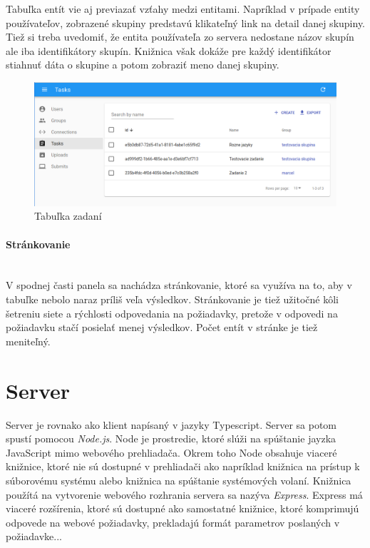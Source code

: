 Tabuľka entít vie aj previazať vzťahy medzi entitami. Napríklad v prípade entity používateľov, 
zobrazené skupiny predstavú klikateľný link na detail danej skupiny. Tiež si treba uvedomiť, že
entita používateľa zo servera nedostane názov skupín ale iba identifikátory skupín. Knižnica 
však dokáže pre každý identifikátor stiahnuť dáta o skupine a potom zobraziť meno danej skupiny.
\begin{figure}[H]
\centerline{\includegraphics[width=1\textwidth]{images/zadania}}
\caption[Tabuľka zadaní]{Tabuľka zadaní}
\label{obr:zadania}
\end{figure}

\paragraph{Stránkovanie}\leavevmode\\
V spodnej časti panela sa nachádza stránkovanie, ktoré sa využíva na to, aby v tabuľke nebolo naraz
príliš veľa výsledkov. Stránkovanie je tiež užitočné kôli šetreniu siete a rýchlosti odpovedania na
požiadavky, pretože v odpovedi na požiadavku stačí posielať menej výsledkov. Počet entít v stránke
je tiež meniteľný.

\section{Server}
Server je rovnako ako klient napísaný v jazyky Typescript. Server sa potom spustí pomocou
\textit{Node.js}. Node je prostredie, ktoré slúži na spúštanie jayzka JavaScript mimo webového
prehliadača. Okrem toho Node obsahuje viaceré knižnice, ktoré nie sú dostupné v prehliadači ako
napríklad knižnica na prístup k súborovému systému alebo knižnica na spúštanie systémových volaní.
Knižnica použítá na vytvorenie webového rozhrania servera sa nazýva \textit{Express}. Express má
viaceré rozšírenia, ktoré sú dostupné ako samostatné knižnice, ktoré komprimujú odpovede na webové
požiadavky, prekladajú formát parametrov poslaných v požiadavke...

